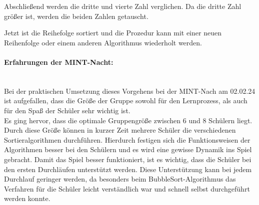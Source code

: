 \documentclass[./entry.tex]{subfiles}
\begin{document}
    Abschließend werden die dritte und vierte Zahl verglichen.
    Da die dritte Zahl größer ist, werden die beiden Zahlen getauscht.

    \vspace{0.5cm}


    Jetzt ist die Reihefolge sortiert und die Prozedur kann
    mit einer neuen Reihenfolge oder einem anderen Algorithmus wiederholt werden.
   \\
	\paragraph{Erfahrungen der MINT-Nacht:} \mbox{} \\
	Bei der praktischen Umsetzung dieses Vorgehens bei der MINT-Nach am 02.02.24 ist aufgefallen, dass die Größe der Gruppe sowohl für den Lernprozess, als auch für den Spaß der Schüler sehr wichtig ist.
	\\
	Es ging hervor, dass die optimale Gruppengröße zwischen 6 und 8 Schülern liegt.
	Durch diese Größe können in kurzer Zeit mehrere Schüler die verschiedenen Sortieralgorithmen durchführen.
	Hierdurch festigen sich die Funktionsweisen der Algorithmen besser bei den Schülern und es wird eine gewisse Dynamik ins Spiel gebracht.
	Damit das Spiel besser funktioniert, ist es wichtig, dass die Schüler bei den ersten Durchläufen unterstützt werden.
	Diese Unterstützung kann bei jedem Durchlauf geringer werden, da besonders beim BubbleSort-Algorithmus das Verfahren für die Schüler leicht verständlich war und schnell selbst durchgeführt werden konnte.
	
\end{document}
